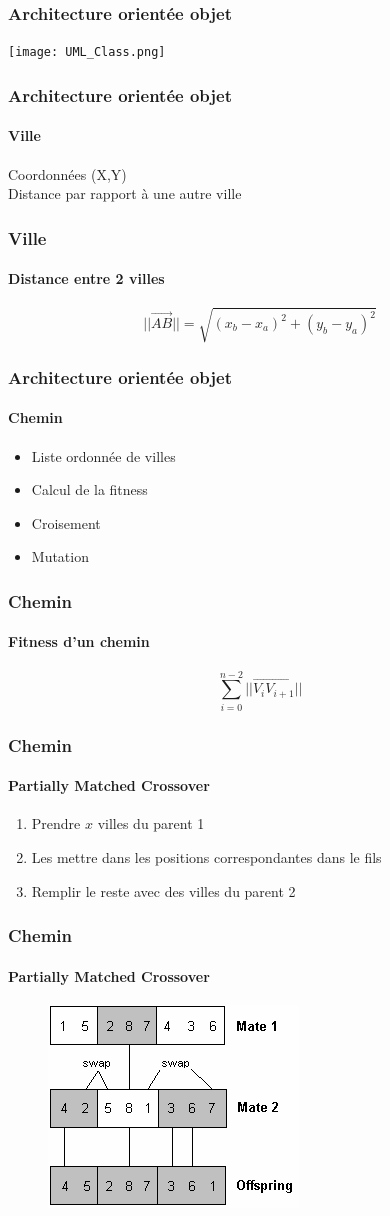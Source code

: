 \documentclass[16pt]{beamer}
\begin{document}
\begin{frame}
\frametitle{Architecture orientée objet}
\texttt{[image: UML\_Class.png]}
\end{frame}
\begin{frame}[fragile]
\frametitle{Architecture orientée objet}
\framesubtitle{\textbf{Ville}}
Coordonnées (X,Y) \\
Distance par rapport à une autre ville
\end{frame}

\begin{frame}
  \frametitle{Ville}
  \framesubtitle{Distance entre 2 villes}
  \begin{center}
  \[
    ||\overrightarrow{AB}|| = \sqrt{(x_b - x_a)^2 + (y_b - y_a)^2}
  \]
  \end{center}
\end{frame}

\begin{frame}
  \frametitle{Architecture orientée objet}
  \framesubtitle{\textbf{Chemin}}
  \begin{itemize}
    \item Liste ordonnée de villes
    \item Calcul de la fitness
    \item Croisement
    \item Mutation
  \end{itemize}
\end{frame}

\begin{frame}
  \frametitle{Chemin}
  \framesubtitle{Fitness d'un chemin}
  \[
    \sum_{i = 0}^{n-2} ||\overrightarrow{V_{i}V_{i+1}}||
  \]
\end{frame}

\begin{frame}
  \frametitle{Chemin}
  \framesubtitle{Partially Matched Crossover}
    \begin{enumerate}
      \item Prendre $x$ villes du parent 1
      \item Les mettre dans les positions correspondantes dans le fils
      \item Remplir le reste avec des villes du parent 2
    \end{enumerate}
\end{frame}

\begin{frame}
  \frametitle{Chemin}
  \framesubtitle{Partially Matched Crossover}
  \begin{figure}
    \includegraphics[scale=0.9]{pmx.png}
    \end{figure}
\end{frame}
\end{document}
